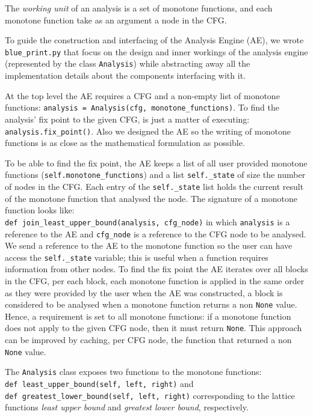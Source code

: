 The \emph{working unit} of an analysis is a set of monotone functions, and each monotone function take as an argument a node in the CFG. 

To guide the construction and interfacing of the Analysis Engine (AE), we wrote \lstinline{blue_print.py} that focus on the design and inner workings of the analysis engine (represented by the class \lstinline{Analysis}) while abstracting away all the implementation details about the components interfacing with it. 

\newpar At the top level the AE requires a CFG and a non-empty list of monotone functions: \lstinline{analysis = Analysis(cfg, monotone_functions)}. To find the analysis' fix point to the given CFG, is just a matter of executing: \lstinline{analysis.fix_point()}. Also we designed the AE so the writing of monotone functions is as close as the mathematical formulation as possible.

\newpar To be able to find the fix point, the AE keeps a list of all user provided monotone functions (\lstinline{self.monotone_functions}) and a list \lstinline{self._state} of size the number of nodes in the CFG. Each entry of the \lstinline{self._state} list holds the current result of the monotone function that analysed the node. The signature of a monotone function looks like: \\\lstinline{def join_least_upper_bound(analysis, cfg_node)} in which \lstinline{analysis} is a reference to the AE and \lstinline{cfg_node} is a reference to the CFG node to be analysed. We send a reference to the AE to the monotone function so the user can have access the
\lstinline{self._state} variable; this is useful when a function requires information from other nodes.
To find the fix point the AE iterates over all blocks in the CFG, per each block, each monotone function is applied in the same order as they were provided by the user when the AE was constructed, a block is considered to be analysed when a monotone function returns a non \lstinline{None} value. Hence, a requirement is set to all monotone functions: if a monotone function does not apply to the given CFG node, then it must return \lstinline{None}. This approach can be improved by caching, per CFG node, the function that returned a non \lstinline{None} value.

\newpar The \lstinline{Analysis} class exposes two functions to the monotone functions: \\\lstinline{def least_upper_bound(self, left, right)} and \\\lstinline{def greatest_lower_bound(self, left, right)} corresponding to the lattice functions \emph{least upper bound} and \emph{greatest lower bound}, respectively.

